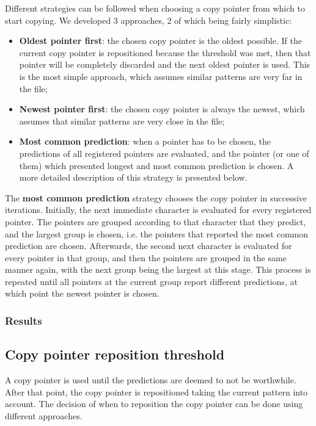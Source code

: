 \documentclass{article}
\begin{document}
Different strategies can be followed when choosing a copy pointer from which to start copying.
We developed 3 approaches, 2 of which being fairly simplistic:
\begin{itemize}
    \item \textbf{Oldest pointer first}: the chosen copy pointer is the oldest possible. If the current copy pointer is repositioned because the threshold was met, then that pointer will be completely discarded and the next oldest pointer is used.
    This is the most simple approach, which assumes similar patterns are very far in the file;
    \item \textbf{Newest pointer first}: the chosen copy pointer is always the newest, which assumes that similar patterns are very close in the file;
    \item \textbf{Most common prediction}: when a pointer has to be chosen, the predictions of all registered pointers are evaluated, and the pointer (or one of them) which presented longest and most common prediction is chosen.
    A more detailed description of this strategy is presented below.
\end{itemize}

The \textbf{most common prediction} strategy chooses the copy pointer in successive iterations.
Initially, the next immediate character is evaluated for every registered pointer.
The pointers are grouped according to that character that they predict, and the largest group is chosen, i.e. the pointers that reported the most common prediction are chosen.
Afterwards, the second next character is evaluated for every pointer in that group, and then the pointers are grouped in the same manner again, with the next group being the largest at this stage.
This process is repeated until all pointers at the current group report different predictions, at which point the newest pointer is chosen.


\subsubsection{Results}

\subsection{Copy pointer reposition threshold}

A copy pointer is used until the predictions are deemed to not be worthwhile.
After that point, the copy pointer is repositioned taking the current pattern into account.
The decision of when to reposition the copy pointer can be done using different approaches.
\end{document}
